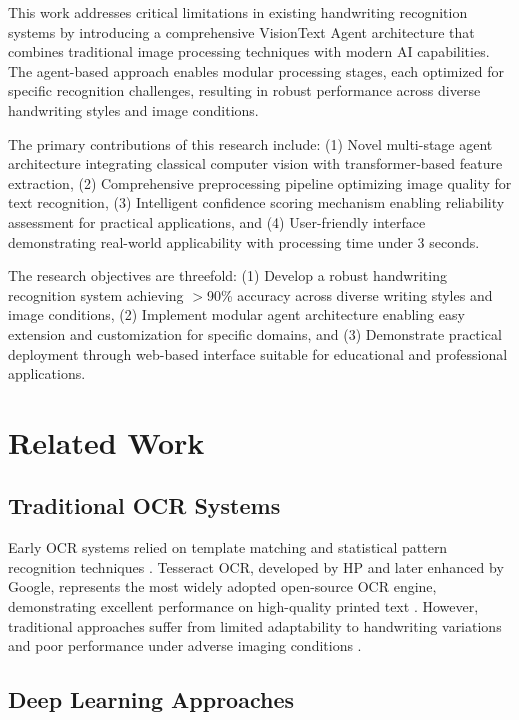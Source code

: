 \documentclass[10pt,twocolumn]{article}
\begin{document}
This work addresses critical limitations in existing handwriting recognition systems by introducing a comprehensive VisionText Agent architecture that combines traditional image processing techniques with modern AI capabilities. The agent-based approach enables modular processing stages, each optimized for specific recognition challenges, resulting in robust performance across diverse handwriting styles and image conditions.

The primary contributions of this research include: (1) Novel multi-stage agent architecture integrating classical computer vision with transformer-based feature extraction, (2) Comprehensive preprocessing pipeline optimizing image quality for text recognition, (3) Intelligent confidence scoring mechanism enabling reliability assessment for practical applications, and (4) User-friendly interface demonstrating real-world applicability with processing time under 3 seconds.

The research objectives are threefold: (1) Develop a robust handwriting recognition system achieving $>$90\% accuracy across diverse writing styles and image conditions, (2) Implement modular agent architecture enabling easy extension and customization for specific domains, and (3) Demonstrate practical deployment through web-based interface suitable for educational and professional applications.

\section{\large Related Work}

\subsection{Traditional OCR Systems}

Early OCR systems relied on template matching and statistical pattern recognition techniques \cite{cheriet2007character}. Tesseract OCR, developed by HP and later enhanced by Google, represents the most widely adopted open-source OCR engine, demonstrating excellent performance on high-quality printed text \cite{smith2007overview}. However, traditional approaches suffer from limited adaptability to handwriting variations and poor performance under adverse imaging conditions \cite{al2021handwritten}.

\subsection{Deep Learning Approaches}
\end{document}

